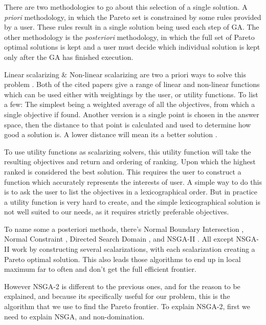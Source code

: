 \documentclass[11pt]{article}
\begin{document}
    There are two methodologies to go about this selection of a single solution. A \textit{priori}
    methodology, in which the Pareto set is constrained by some rules provided by a user.
    These rules result in a single solution being used each step of GA. The other
    methodology is the \textit{posteriori} methodology, in which
    the full set of Pareto optimal solutions is kept and a user must decide which individual
    solution is kept only after the GA has finished execution.

    Linear scalarizing \& Non-linear scalarizing are two a priori ways to solve this problem
    \cite{KaisaMarko, Moffaert}. Both of the cited papers give a range of linear and non-linear
    functions which can be used either with weightings by the user, or utility functions.
    To list a few: The simplest being a weighted average of all the objectives, from
    which a single objective if found. Another version is a single point is chosen
    in the answer space, then the distance to that point is calculated and used to
    determine how good a solution is. A lower distance will mean its a better solution
    \cite{Buchanan}.

    To use utility functions as scalarizing solvers, this utility function will take
    the resulting objectives and return and ordering of ranking. Upon which the highest
    ranked is considered the best solution. This requires the user to construct
    a function which accurately represents the interests of user. A simple way
    to do this is to ask the user to list the objectives in a lexicographical order.
    But in practice a utility function is very hard to create, and the simple
    lexicographical solution is not well suited to our needs, as it requires
    strictly preferable objectives.

    To name some a posteriori methods, there's Normal Boundary Intersection \cite{Indraneel},
    Normal Constraint \cite{Messac}, Directed Search Domain \cite{Tohid}, and NSGA-II
    \cite{DebPratapAgarwalMeyarivan}. All except NSGA-II work by constructing several
    scalarizations, with each scalarization creating a Pareto optimal solution.
    This also leads those algorithms to end up in local maximum far to often and
    don't get the full efficient frontier.

    However NSGA-2 is different to the previous ones, and for the reason to be explained,
    and because its specifically useful for our problem, this is the algorithm that
    we use to find the Pareto frontier. To explain NSGA-2, first we need to explain
    NSGA, and non-domination.
\end{document}
